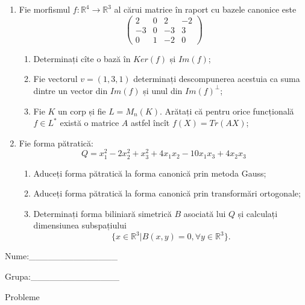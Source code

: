 \documentclass{article}
\begin{document}
\begin{enumerate}
 \item Fie morfismul $f:\mathbb{R}^4 \to \mathbb{R}^3$ al cărui matrice în raport cu bazele canonice este
$$\begin{pmatrix}
2&0&2&-2\\
-3&0&-3&3\\
0&1&-2&0
\end{pmatrix}$$

\begin{enumerate}
\item Determinați cîte o bază în $Ker(f)$ și $Im(f)$;
\item Fie vectorul $v=(1,3,1)$ determinați descompunerea acestuia ca suma dintre un vector din $Im(f)$ și unul din $Im(f)^\perp$;
\item Fie $K$ un corp și fie $L=M_n(K)$. Arătați că pentru orice funcțională $f \in L^*$ există o matrice $A$ astfel încît $f(X)=Tr(AX)$;
\end{enumerate}
\item Fie forma pătratică:
$$Q= x_1^2-2x_2^2+x_3^2+4x_1x_2-10x_1x_3+4x_2x_3$$

\begin{enumerate}
\item Aduceți forma pătratică la forma canonică prin metoda Gauss;
\item Aduceți forma pătratică la forma canonică prin transformări ortogonale;
\item Determinați forma biliniară simetrică $B$ asociată lui $Q$ și calculați dimensiunea subspațiului
$$\{x \in \mathbb{R}^3 | B(x,y)=0,\forall y \in \mathbb{R}^3\}.$$

\end{enumerate}
\end{enumerate}
\newpage
\begin{flushright}
Nume:\_\_\_\_\_\_\_\_\_\_\_\_\_\_
 
 
Grupa:\_\_\_\_\_\_\_\_\_\_\_\_\_\_
\end{flushright}
\begin{center}
\vspace{2cm}
{\Large Probleme}
\vspace{2cm}
\end{center}
\end{document}
